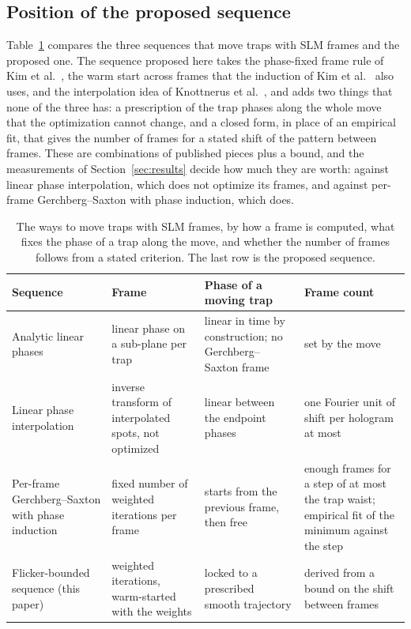 \subsection{Position of the proposed sequence}

Table~\ref{tab:related} compares the three sequences that move traps with SLM frames and the proposed one. The sequence proposed here takes the phase-fixed frame rule of Kim et al.~\cite{kimol}, the warm start across frames that the induction of Kim et al.~\cite{kimoe} also uses, and the interpolation idea of Knottnerus et al.~\cite{lpi}, and adds two things that none of the three has: a prescription of the trap phases along the whole move that the optimization cannot change, and a closed form, in place of an empirical fit, that gives the number of frames for a stated shift of the pattern between frames. These are combinations of published pieces plus a bound, and the measurements of Section~\ref{sec:results} decide how much they are worth: against linear phase interpolation, which does not optimize its frames, and against per-frame Gerchberg--Saxton with phase induction, which does.

\begin{table}[t]
\centering\small
\caption{The ways to move traps with SLM frames, by how a frame is computed, what fixes the phase of a trap along the move, and whether the number of frames follows from a stated criterion. The last row is the proposed sequence.}
\label{tab:related}
\begin{tabular}{@{}p{3.1cm} p{3.0cm} p{3.9cm} p{3.9cm}@{}}
\toprule
Sequence & Frame & Phase of a moving trap & Frame count\\
\midrule
Analytic linear phases~\cite{kim2016} & linear phase on a sub-plane per trap & linear in time by construction; no Gerchberg--Saxton frame & set by the move\\
Linear phase interpolation~\cite{lpi} & inverse transform of interpolated spots, not optimized & linear between the endpoint phases & one Fourier unit of shift per hologram at most\\
Per-frame Gerchberg--Saxton with phase induction~\cite{kimoe} & fixed number of weighted iterations per frame & starts from the previous frame, then free & enough frames for a step of at most the trap waist; empirical fit of the minimum against the step\\
Flicker-bounded sequence (this paper) & weighted iterations, warm-started with the weights & locked to a prescribed smooth trajectory & derived from a bound on the shift between frames\\
\bottomrule
\end{tabular}
\end{table}

